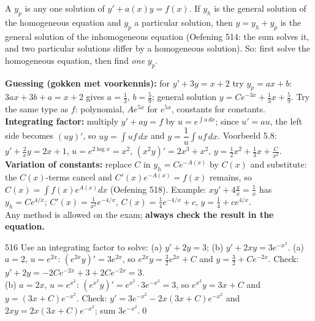 \begin{result}[{Definition 5.6, Stelling 5.7 \textperiodcentered\ general = homogeneous + particular}]
A  $y_p$ is any one solution of $y'+a(x)y=f(x)$. If $y_h$ is the general solution of the homogeneous equation and $y_p$ a particular solution, then $y=y_h+y_p$ is the general solution of the inhomogeneous equation (Oefening 514: the sum solves it, and two particular solutions differ by a homogeneous solution). So: first solve the homogeneous equation, then find \emph{one} $y_p$.
\end{result}
\begin{strategy}
\textbf{Guessing (gokken met voorkennis):} for $y'+3y=x+2$ try $y_p=ax+b$: $3ax+3b+a=x+2$ gives $a=\frac13$, $b=\frac59$; general solution $y=Ce^{-3x}+\frac13x+\frac59$. Try the same type as $f$: polynomial, $Ae^{5x}$ for $e^{5x}$, constants for constants.\\
\textbf{Integrating factor:} multiply $y'+ay=f$ by $u=e^{\int a\,dx}$; since $u'=au$, the left side becomes $(uy)'$, so $uy=\int uf\,dx$ and $y=\dfrac1u\int uf\,dx$. Voorbeeld 5.8: $y'+\frac2xy=2x+1$, $u=e^{2\log x}=x^2$, $(x^2y)'=2x^3+x^2$, $y=\frac12x^2+\frac13x+\frac C{x^2}$.\\
\textbf{Variation of constants:} replace $C$ in $y_h=Ce^{-A(x)}$ by $C(x)$ and substitute: the $C(x)$-terms cancel and $C'(x)e^{-A(x)}=f(x)$ remains, so $C(x)=\int f(x)e^{A(x)}dx$ (Oefening 518). Example: $xy'+4\frac yx=\frac1x$ has $y_h=Ce^{4/x}$; $C'(x)=\frac1{x^2}e^{-4/x}$, $C(x)=\frac14e^{-4/x}+c$, $y=\frac14+ce^{4/x}$.\\
Any method is allowed on the exam; \textbf{always check the result in the equation.}
\end{strategy}

\begin{bookex}{516}
Use an integrating factor to solve: (a) $y'+2y=3$; (b) $y'+2xy=3e^{-x^2}$.
\solution
(a) $a=2$, $u=e^{2x}$: $(e^{2x}y)'=3e^{2x}$, so $e^{2x}y=\frac32e^{2x}+C$ and $y=\frac32+Ce^{-2x}$. Check: $y'+2y=-2Ce^{-2x}+3+2Ce^{-2x}=3$.\\
(b) $a=2x$, $u=e^{x^2}$: $(e^{x^2}y)'=e^{x^2}\cdot3e^{-x^2}=3$, so $e^{x^2}y=3x+C$ and $y=(3x+C)e^{-x^2}$. Check: $y'=3e^{-x^2}-2x(3x+C)e^{-x^2}$ and $2xy=2x(3x+C)e^{-x^2}$; sum $3e^{-x^2}$.\qed
\end{bookex}

